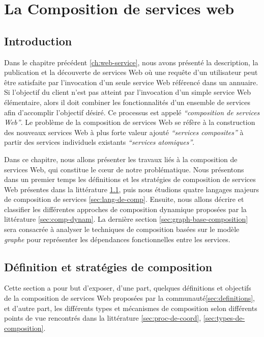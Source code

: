 \chapter{La Composition de services web}
\label{ch:composition}

\section*{Introduction}
 

Dans le chapitre précédent \ref{ch:web-service}, nous avons présenté
la description, la publication et la découverte de services Web où une
requête d'un utilisateur peut être satisfaite par l'invocation d'un
seule service Web référencé dans un annuaire. Si l'objectif du client
n'est pas atteint par l'invocation d'un simple service Web
élémentaire, alors il doit combiner les fonctionnalités d'un ensemble
de services afin d'accomplir l'objectif désiré. Ce processus est
appelé \textit{``composition de services Web''}. Le problème de la
composition de services Web se réfère à la construction des nouveaux
services Web à plus forte valeur ajouté \textit{``services
  composites''} à partir des services individuels existants
\textit{``services atomiques''}.\bigskip

Dans ce chapitre, nous allons présenter les travaux liés à la
composition de services Web, qui constitue le cœur de notre
problématique. Nous présentons dans un premier temps les définitions
et les stratégies de composition de services Web présentes dans la
littérature \ref{sec:defs}, puis nous étudions quatre langages majeurs
de composition de services \ref{sec:lang-de-comp}. Ensuite, nous
allons décrire et classifier les différentes approches de composition
dynamique proposées par la littérature \ref{sec:comp-dynam}. La
dernière section \ref{sec:graph-base-composition} sera consacrée à
analyser le techniques de composition basées sur le modèle
\textit{graphe} pour représenter les dépendances fonctionnelles entre
les services.

\newpage
\section{Définition et stratégies de composition}
\label{sec:defs}
Cette section a pour but d'exposer, d'une part, quelques définitions
et objectifs de la composition de services Web proposées par la
communauté\ref{sec:definitions}, et d'autre part, les différents types
et mécanismes de composition selon différents points de vue rencontrés
dans la littérature \ref{sec:proc-de-coord},
\ref{sec:types-de-composition}.

